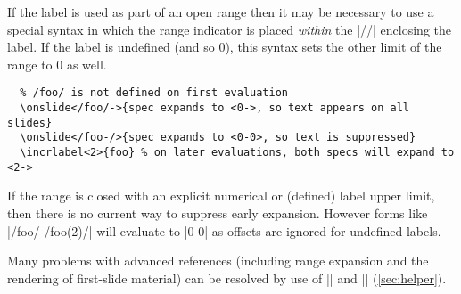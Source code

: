 \documentclass[a4paper]{ltxdoc}
\begin{document}
If the label is used as part of an open range then it may be necessary to use a
special syntax in which the range indicator is placed \emph{within} the |//|
enclosing the label.  If the label is undefined (and so 0), this syntax sets the
other limit of the range to 0 as well.
\example
\begin{verbatim}
  % /foo/ is not defined on first evaluation
  \onslide</foo/->{spec expands to <0->, so text appears on all slides}
  \onslide</foo-/>{spec expands to <0-0>, so text is suppressed}
  \incrlabel<2>{foo} % on later evaluations, both specs will expand to <2->
\end{verbatim}
If the range is closed with an explicit numerical or (defined) label upper
limit, then there is no current way to suppress early expansion.  However forms
like |/foo/-/foo(2)/| will evaluate to |0-0| as offsets are ignored for
undefined labels.

Many problems with advanced references (including range expansion and the
rendering of first-slide material) can be resolved by use of |\framescanonly|
and |\againframe| (\cref{sec:helper}).
\end{document}
